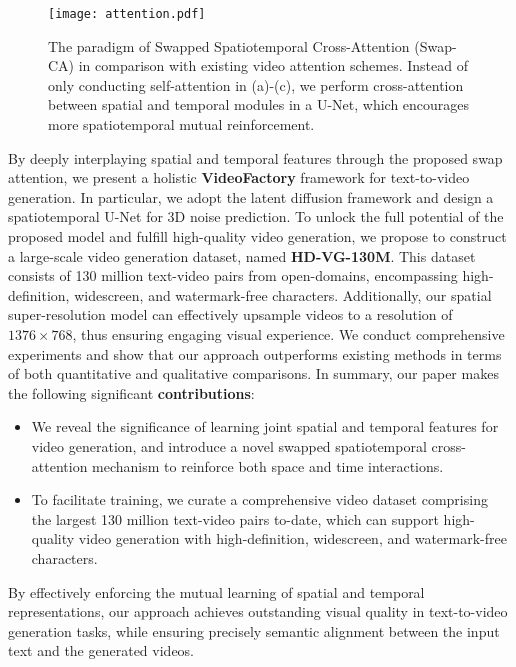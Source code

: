 \documentclass{article}
\begin{document}
\begin{figure}[t]
    \centering
    \texttt{[image: attention.pdf]}
    \caption{The paradigm of Swapped Spatiotemporal Cross-Attention (Swap-CA) in comparison with existing video attention schemes. Instead of only conducting self-attention in (a)-(c), we perform cross-attention between spatial and temporal modules in a U-Net, which encourages more spatiotemporal mutual reinforcement.}
    \label{fig:teaser_attn}
\end{figure}

By deeply interplaying spatial and temporal features through the proposed swap attention, we present a holistic \textbf{VideoFactory} framework for text-to-video generation. In particular, we adopt the latent diffusion framework and design a spatiotemporal U-Net for 3D noise prediction. To unlock the full potential of the proposed model and fulfill high-quality video generation, we propose to construct a large-scale video generation dataset, named \textbf{HD-VG-130M}. This dataset consists of 130 million text-video pairs from open-domains, encompassing high-definition, widescreen, and watermark-free characters. 
Additionally, our spatial super-resolution model can effectively upsample videos to a resolution of $1376\times768$, thus ensuring engaging visual experience. We conduct comprehensive experiments and show that our approach outperforms existing methods in terms of both quantitative and qualitative comparisons. In summary, our paper makes the following significant \textbf{contributions}: 
\begin{itemize}[nosep]
    \item We reveal the significance of learning joint spatial and temporal features for video generation, and introduce a novel swapped spatiotemporal cross-attention mechanism to reinforce both space and time interactions. 
    \item To facilitate training, we curate a comprehensive video dataset comprising the largest 130 million text-video pairs to-date, which can support high-quality video generation with high-definition, widescreen, and watermark-free characters.
\end{itemize}
By effectively enforcing the mutual learning of spatial and temporal representations, our approach achieves outstanding visual quality in text-to-video generation tasks, while ensuring precisely semantic alignment between the input text and the generated videos.
\end{document}
